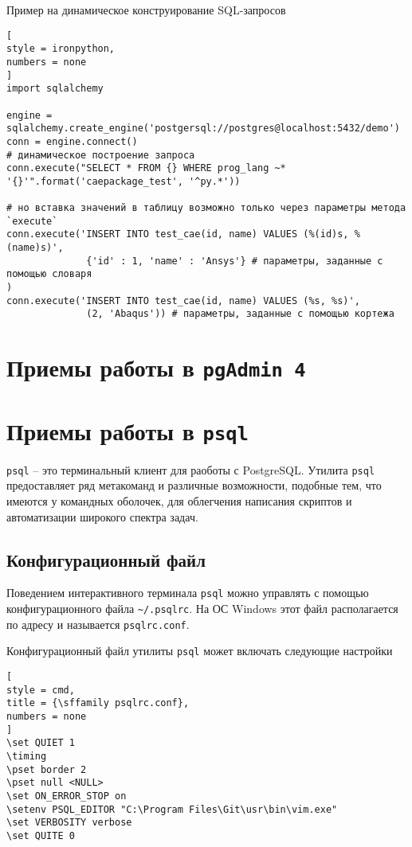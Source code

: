 \documentclass[%
	11pt,
	a4paper,
	utf8,
		]{article}
\begin{document}
Пример на динамическое конструирование SQL-запросов
\begin{lstlisting}[
style = ironpython,
numbers = none
]
import sqlalchemy

engine = sqlalchemy.create_engine('postgersql://postgres@localhost:5432/demo')
conn = engine.connect()
# динамическое построение запроса
conn.execute("SELECT * FROM {} WHERE prog_lang ~* '{}'".format('caepackage_test', '^py.*'))

# но вставка значений в таблицу возможно только через параметры метода `execute`
conn.execute('INSERT INTO test_cae(id, name) VALUES (%(id)s, %(name)s)',
              {'id' : 1, 'name' : 'Ansys'} # параметры, заданные с помощью словаря
)
conn.execute('INSERT INTO test_cae(id, name) VALUES (%s, %s)',
              (2, 'Abaqus')) # параметры, заданные с помощью кортежа
\end{lstlisting}


\section{Приемы работы в \texttt{pgAdmin 4}}

\section{Приемы работы в \texttt{psql}}

\texttt{psql} -- это терминальный клиент для раоботы с PostgreSQL. Утилита \texttt{psql} предоставляет ряд метакоманд и различные возможности, подобные тем, что имеются у командных оболочек, для облегчения написания скриптов и автоматизации широкого спектра задач.

\subsection{Конфигурационный файл}

Поведением интерактивного терминала \texttt{psql} можно управлять с помощью конфигурационного файла \verb|~/.psqlrc|. На ОС Windows этот файл располагается по адресу  и называется \verb|psqlrc.conf|.

Конфигурационный файл утилиты \texttt{psql} может включать следующие настройки
\begin{lstlisting}[
style = cmd,
title = {\sffamily psqlrc.conf},
numbers = none
]
\set QUIET 1
\timing
\pset border 2
\pset null <NULL>
\set ON_ERROR_STOP on
\setenv PSQL_EDITOR "C:\Program Files\Git\usr\bin\vim.exe"
\set VERBOSITY verbose
\set QUITE 0
\end{lstlisting}
\end{document}
